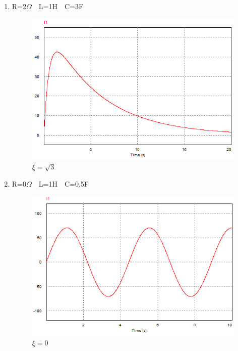 \documentclass[titlepage, a4paper, 11pt, reqno, openany]{report}
\begin{document}
\begin{enumerate}
\begin{enumerate}
\item
R=2$\Omega$\ \  L=1H\ \  C=3F\par
\begin{figure}[H]
\centering
\includegraphics[scale=1]{./image/PSIM_16.png}
\caption{$\xi=\sqrt{3}$}
\label{figura 28}
\end{figure}\par
\item
R=0$\Omega$\ \  L=1H\ \  C=0,5F\par
\begin{figure}[H]
\centering
\includegraphics[scale=1]{./image/PSIM_17.png}
\caption{$\xi=0$}
\label{figura 29}
\end{figure}\par
%
\end{enumerate}
\end{enumerate}
\end{document}
